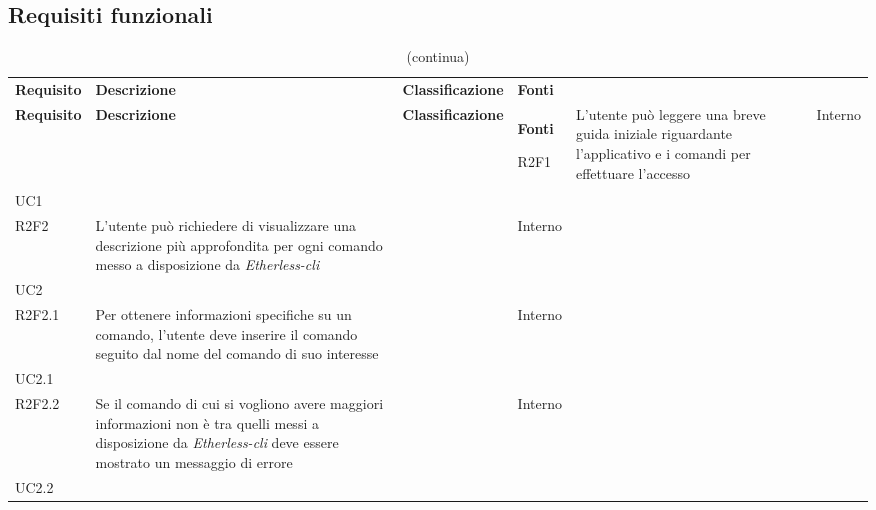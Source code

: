 \subsection{Requisiti funzionali}

\def\arraystretch{1.75}
\begin{longtable}{ 
		>{\centering}p{} 
		>{}p{} 
		>{\centering}p{}
		>{\centering}p{} }
	
	\caption{Tabella dei requisiti funzionali} \\
	\coloredTableHead
	\textbf{\color{white}Requisito} & 
	\centering\textbf{\color{white}Descrizione} & 
	\centering\textbf{\color{white}Classificazione} &
	\textbf{\color{white}Fonti} 
	\endfirsthead
	
	\caption[]{(continua)}\\
	\textbf{\color{white}Requisito} &
	\centering\textbf{\color{white}Descrizione} &
	\centering\textbf{\color{white}Classificazione} &
	\textbf{\color{white}Fonti} 
	\endhead

	R2F1 & L'utente può leggere una breve guida iniziale riguardante l'applicativo
			e i comandi per effettuare l'accesso 									& \de & Interno \\ UC1 \tabularnewline

	R2F2 & L'utente può richiedere di visualizzare una descrizione più approfondita
		 per ogni comando messo a disposizione da \textit{Etherless-cli}			& \de & Interno \\ UC2 \tabularnewline
	R2F2.1 & Per ottenere informazioni specifiche su un comando, l'utente deve
		inserire il comando \help{} seguito dal nome del comando di suo interesse	& \de & Interno \\ UC2.1 \tabularnewline
	R2F2.2 & Se il comando di cui si vogliono avere maggiori informazioni non
		è tra quelli messi a disposizione da \textit{Etherless-cli} deve essere
		mostrato un messaggio di errore												& \de & Interno \\ UC2.2 \tabularnewline


\end{longtable}
